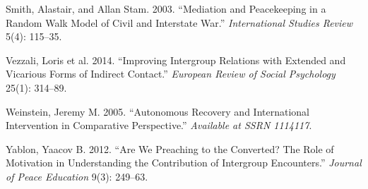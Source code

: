 \documentclass[11pt]{article}
\begin{document}
\hypertarget{ref-smith2003mediation}{}
Smith, Alastair, and Allan Stam. 2003. ``Mediation and Peacekeeping in a
Random Walk Model of Civil and Interstate War.'' \emph{International
Studies Review} 5(4): 115--35.

\hypertarget{ref-vezzali2014indirect}{}
Vezzali, Loris et al. 2014. ``Improving Intergroup Relations with
Extended and Vicarious Forms of Indirect Contact.'' \emph{European
Review of Social Psychology} 25(1): 314--89.

\hypertarget{ref-weinstein2005autonomous}{}
Weinstein, Jeremy M. 2005. ``Autonomous Recovery and International
Intervention in Comparative Perspective.'' \emph{Available at SSRN
1114117}.

\hypertarget{ref-yablon2012we}{}
Yablon, Yaacov B. 2012. ``Are We Preaching to the Converted? The Role of
Motivation in Understanding the Contribution of Intergroup Encounters.''
\emph{Journal of Peace Education} 9(3): 249--63.
\end{document}
